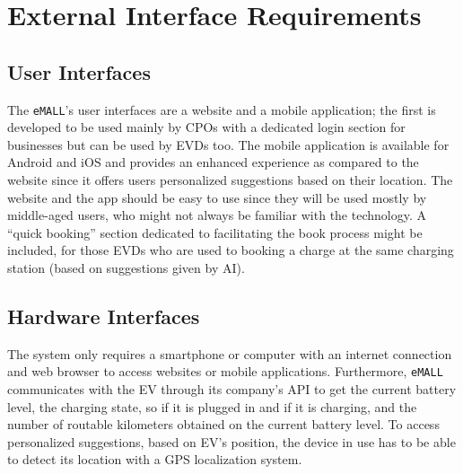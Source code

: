 \section{External Interface Requirements}
\label{sec:external_interface_requirements}%

\subsection{User Interfaces}
\label{subsec:user_interfaces}%
The \verb|eMALL|’s user interfaces are a website and a mobile application;
the first is developed to be used mainly by CPOs with a dedicated login section for businesses but can be used by EVDs too.
The mobile application is available for Android and iOS and provides an enhanced experience as compared to the website
since it offers users personalized suggestions based on their location.
The website and the app should be easy to use since they will be used mostly by middle-aged users,
who might not always be familiar with the technology.
A “quick booking” section dedicated to facilitating the book process might be included,
for those EVDs who are used to booking a charge at the same charging station (based on suggestions given by AI).

\subsection{Hardware Interfaces}
\label{subsec:hardware_interfaces}%
The system only requires a smartphone or computer with an internet connection and web browser to access websites or mobile applications.
Furthermore, \verb|eMALL| communicates with the EV through its company's API to get the current battery level, the charging state,
so if it is plugged in and if it is charging, and the number of routable kilometers obtained on the current battery level.
To access personalized suggestions, based on EV’s position, the device in use has to be able to detect its location with a GPS localization system.

